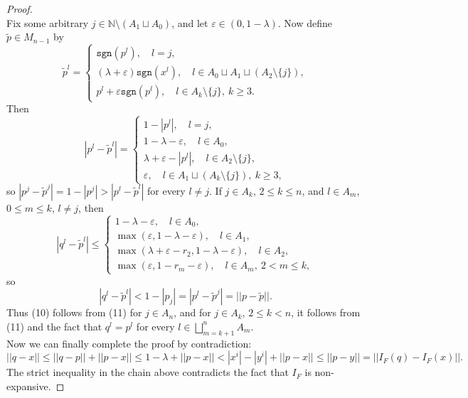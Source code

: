 \documentclass[10pt,a4paper]{amsart}
\newcommand{\N}{\mathbb N}
\begin{document}
\begin{proof}
\begin{equation*}
    \end{equation*}
    Fix some arbitrary $j \in \N \setminus (A_1 \sqcup A_0)$, and let $\varepsilon \in (0,1-\lambda)$. Now define $\tilde p \in M_{n-1}$ by 
    \[\tilde{p}^l=\begin{cases} \mathtt{sgn}(p^l) , \quad l=j,\\
    (\lambda+\varepsilon) \mathtt {sgn}(x^l), \quad l \in A_0 \sqcup A_1 \sqcup (A_2 \setminus  \{j\}),\\
    p^l + \varepsilon \mathtt{sgn}(p^l), \quad l \in A_k \setminus \{j\}, \ k \geq 3.
    \end{cases}\]
Then 
\[|p^l-\tilde{p} ^l|=\begin{cases} 1-|p^l| , \quad l=j,\\
   1- \lambda-\varepsilon , \quad l \in A_0 ,\\
    \lambda +\varepsilon -|p^l|, \quad l \in A_2 \setminus \{j\}, \\
    \varepsilon, \quad l \in A_1 \sqcup(A_k \setminus \{j\}), \ k \geq 3,
    \end{cases}\]
so $|p^j-\tilde{p}^j|=1-|p^j|>|p^l-\tilde{p} ^l|$ for every $l \neq j$. If $j \in A_k$, $2 \leq k \leq n$, and $l \in A_m$, $0 \leq m \leq k$, $l \neq j$, then 
\begin{equation*}
    |q^l-\tilde p ^l| \leq \begin{cases}
        1 - \lambda - \varepsilon, \quad l \in A_0,\\
        \max (\varepsilon, 1-\lambda-\varepsilon), \quad l \in A_1,\\
        \max(\lambda +\varepsilon -r_2, 1-\lambda-\varepsilon), \quad l \in A_2,\\
        \max(\varepsilon,1-r_m-\varepsilon), \quad l \in A_m, \ 2<m\leq k,
    \end{cases}
\end{equation*}
so
\begin{equation}
    |q^l-\tilde p^l|<1-|p_j|=|p^l-\tilde p^j|=||p-\tilde p||.
\end{equation}
Thus (10) follows from (11) for $j \in A_n$, and for $j \in A_k$, $2 \leq k <n$, it follows from (11) and the fact that $q^{l}=p^{l}$ for every $l \in \bigsqcup_{m=k+1}^nA_m$.\\
Now we can finally complete the proof by contradiction:
\[||q-x||\leq||q-p||+||p-x||\leq1-\lambda+||p-x||<|x^i|-|y^i|+||p-x|| \leq||p-y||=||I_F(q)-I_F(x)||.\]
   The strict inequality in the chain above contradicts the fact that $I_F$ is non-expansive.
\end{proof}
\end{document}
